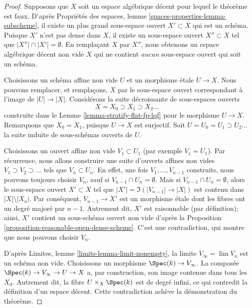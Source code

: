 \begin{proof}
Supposons que $X$ soit un espace algébrique décent pour lequel le théorème
est faux. D'après Propriétés des espaces, lemme
\ref{spaces-properties-lemma-subscheme}, il existe un plus grand sous-espace
ouvert $X' \subset X$ qui est un schéma. Puisque $X'$ n'est pas dense dans
$X$, il existe un sous-espace ouvert $X'' \subset X$ tel que
$|X''| \cap |X'| = \emptyset$. En remplaçant $X$ par $X''$, nous obtenons un
espace algébrique décent non vide $X$ qui ne contient {\it aucun}
sous-espace ouvert qui soit un schéma.

\medskip\noindent
Choisissons un schéma affine non vide $U$ et un morphisme étale $U \to X$.
Nous pouvons remplacer, et remplaçons, $X$ par le sous-espace ouvert
correspondant à l'image de $|U| \to |X|$. Considérons la suite décroissante
de sous-espaces ouverts
$$
X = X_0 \supset X_1 \supset X_2 \ldots
$$
construite dans le Lemme \ref{lemma-stratify-flat-fp-lqf}
pour le morphisme $U \to X$. Remarquons que $X_0 = X_1$, puisque $U \to X$
est surjectif. Soit $U = U_0 = U_1 \supset U_2 \ldots$ la suite induite de
sous-schémas ouverts de $U$.

\medskip\noindent
Choisissons un ouvert affine non vide $V_1 \subset U_1$ (par exemple
$V_1 = U_1$). Par récurrence, nous allons construire une suite d'ouverts
affines non vides $V_1 \supset V_2 \supset \ldots$ tels que $V_n \subset U_n$.
En effet, une fois $V_1, \ldots, V_{n - 1}$ construits, nous pouvons toujours
choisir $V_n$, sauf si $V_{n - 1} \cap U_n = \emptyset$. Mais si
$V_{n - 1} \cap U_n = \emptyset$, alors le sous-espace ouvert
$X' \subset X$ tel que
$|X'| = \Im(|V_{n - 1}| \to |X|)$ est contenu dans $|X| \setminus |X_n|$.
Par conséquent, $V_{n - 1} \to X'$ est un morphisme étale dont les fibres ont
un degré majoré par $n - 1$. Autrement dit, $X'$ est raisonnable (par
définition); ainsi, $X'$ contient un sous-schéma ouvert non vide d'après la
Proposition \ref{proposition-reasonable-open-dense-scheme}.
C'est une contradiction, qui montre que nous pouvons choisir $V_n$.

\medskip\noindent
D'après Limites, lemme \ref{limits-lemma-limit-nonempty},
la limite $V_\infty = \lim V_n$ est un schéma non vide. Choisissons un
morphisme $\Spec(k) \to V_\infty$. La composée
$\Spec(k) \to V_\infty \to U \to X$ a, par construction, son image contenue
dans tous les $X_d$. Autrement dit, la fibre $U \times_X \Spec(k)$ est de
degré infini, ce qui contredit la définition d'un espace décent. Cette
contradiction achève la démonstration du théorème.
\end{proof}

